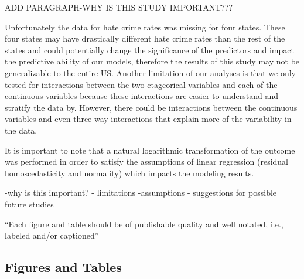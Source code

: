 \documentclass[
]{article}
\begin{document}
ADD PARAGRAPH-WHY IS THIS STUDY IMPORTANT???

Unfortunately the data for hate crime rates was missing for four states.
These four states may have drastically different hate crime rates than
the rest of the states and could potentially change the significance of
the predictors and impact the predictive ability of our models,
therefore the results of this study may not be generalizable to the
entire US. Another limitation of our analyses is that we only tested for
interactions between the two ctageorical variables and each of the
continuous variables because these interactions are easier to understand
and stratify the data by. However, there could be interactions between
the continuous variables and even three-way interactions that explain
more of the variability in the data.

It is important to note that a natural logarithmic transformation of the
outcome was performed in order to satisfy the assumptions of linear
regression (residual homoscedasticity and normality) which impacts the
modeling results.

-why is this important? - limitations -assumptions - suggestions for
possible future studies

``Each figure and table should be of publishable quality and well
notated, i.e., labeled and/or captioned''

\hypertarget{figures-and-tables}{%
\subsection{Figures and Tables}\label{figures-and-tables}}
\end{document}
